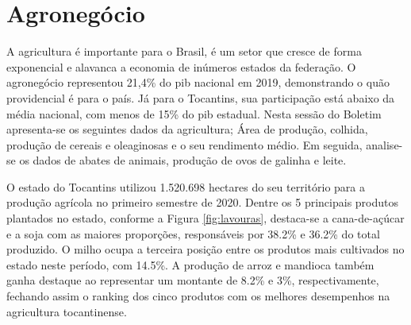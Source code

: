 
\chapter{Agronegócio}
\par A agricultura é importante para o Brasil, é um setor que cresce de forma exponencial e alavanca a economia de inúmeros estados da federação. O agronegócio representou 21,4\% do \acrshort{pib} nacional em 2019, demonstrando o quão providencial é para o país. Já para o Tocantins, sua participação está abaixo da média nacional, com menos de 15\% do \acrshort{pib} estadual. Nesta sessão do Boletim apresenta-se os seguintes dados da agricultura; Área de produção, colhida, produção de cereais e oleaginosas e o seu rendimento médio. Em seguida, analise-se os dados de abates de animais, produção de ovos de galinha e leite.

\par O estado do Tocantins utilizou 1.520.698 hectares do seu território para a produção agrícola no primeiro semestre de 2020. Dentre os 5 principais produtos plantados no estado, conforme a Figura \ref{fig:lavouras}, destaca-se a cana-de-açúcar e a soja com as maiores proporções, responsáveis por 38.2\% e 36.2\% do total produzido. O milho ocupa a terceira posição entre os produtos mais cultivados no estado neste período, com 14.5\%. A produção de arroz e mandioca também ganha destaque ao representar um montante de 8.2\% e 3\%, respectivamente, fechando assim o ranking dos cinco produtos com os melhores desempenhos na agricultura tocantinense.

